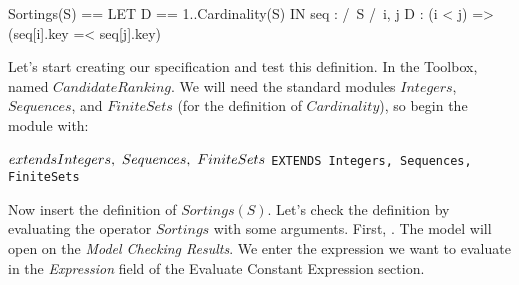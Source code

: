 \documentclass[fleqn,leqno]{article}
\begin{document}
\begin{display}
\begin{notla}
Sortings(S) ==
  LET D == 1..Cardinality(S)
  IN { seq \in [D -> S] :
        /\ S 
        /\ \A i, j \in D : (i < j) => (seq[i].key =< seq[j].key) }
\end{notla}
\begin{tlatex}
%
%
%
%
\end{tlatex}
\end{display}
Let's start creating our specification and test this definition.  In
the Toolbox,  named
$CandidateRanking$.  We will need the standard modules $Integers$,
$Sequences$, and $FiniteSets$ (for the definition of $Cardinality$),
so begin the module with:
\begin{twocols}
$\EXTENDS Integers, \ Sequences, \ FiniteSets$
\midcol
\verb|EXTENDS Integers, Sequences, FiniteSets|
\end{twocols}
Now insert the definition of $Sortings(S)$.  Let's check the
definition by evaluating the operator $Sortings$ with some arguments.
First, .  The model will
open on the \emph{Model Checking Results}.  We enter the expression we
want to evaluate in the \emph{Expression} field of the
\textsf{Evaluate Constant Expression} section.
\end{document}
